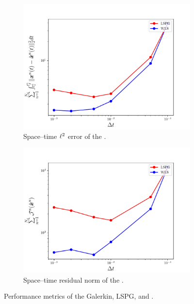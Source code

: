 \begin{figure}
\begin{center}
\begin{subfigure}[t]{0.45\textwidth}
\includegraphics[width=1.\linewidth]{figs/sod/error_vs_window_dtvar.pdf}
\caption{Space--time $\ell^2$ error of the \methodAcronymROM.}
\label{fig:sod_error_methods_a}
\end{subfigure}
\begin{subfigure}[t]{0.45\textwidth}
\includegraphics[width=1.\linewidth]{figs/sod/objective_vs_window_dtvar.pdf}
\caption{Space--time residual norm of the \methodAcronymROM.} 
\label{fig:sod_error_methods_b}
\end{subfigure}
\caption{Performance metrics of the Galerkin, LSPG, and \methodAcronymROMs.} 
\label{fig:time_step_study}
\end{center}
\end{figure}

